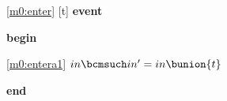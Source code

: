 \noindent \ref{m0:enter} [t] \textbf{event}
\begin{block}
  \item   \textbf{begin}
  \begin{block}
  \item[ \eqref{m0:entera1} ]$in \bcmsuch in' = in \bunion \{ t \} $ %
  \end{block}
  \item   \textbf{end} \\
\end{block}
